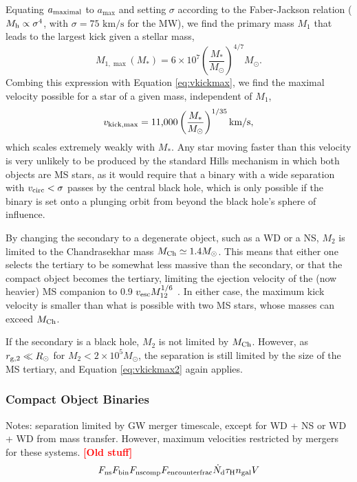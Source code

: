 \documentclass[a4paper,twocolumn]{emulateapj}
\newcommand{\colr}[1]{{\bf \textcolor{red}{[#1]}}}
\begin{document}
Equating $a_{\rm maximal}$ to $a_{\max}$ and setting $\sigma$ according to the Faber-Jackson relation ($M_{\rm h} \propto \sigma^{4}$, with $\sigma = \textrm{75 km/s}$ for the MW), we find the primary mass $M_{1}$ that leads to the largest kick given a stellar mass,
\begin{equation}
M_{1,\max} (M_{\ast}) = 6 \times 10^{7} \left(\frac{M_{\ast}}{M_{\odot}}\right)^{4/7} M_{\odot}.
\end{equation}
Combing this expression with Equation \ref{eq:vkickmax}, we find the maximal velocity possible for a star of a given mass, independent of $M_{1}$,
\begin{equation}
v_{\rm kick,\max} = \textrm{11,000} \left(\frac{M_{\ast}}{M_{\odot}}\right)^{1/35} \textrm{km/s}\label{eq:vkickmax2},
\end{equation}
which scales extremely weakly with $M_{\ast}$. Any star moving faster than this velocity is very unlikely to be produced by the standard Hills mechanism in which both objects are MS stars, as it would require that a binary with a wide separation with $v_{\rm circ} < \sigma$ passes by the central black hole, which is only possible if the binary is set onto a plunging orbit from beyond the black hole's sphere of influence.

By changing the secondary to a degenerate object, such as a WD or a NS, $M_{2}$ is limited to the Chandrasekhar mass $M_{\rm Ch} \simeq 1.4 M_{\odot}$. This means that either one selects the tertiary to be somewhat less massive than the secondary, or that the compact object becomes the tertiary, limiting the ejection velocity of the (now heavier) MS companion to 0.9 $v_{\rm esc} M_{12}^{1/6}$ \citep{Sari:2010a}. In either case, the maximum kick velocity is smaller than what is possible with two MS stars, whose masses can exceed $M_{\rm Ch}$.

If the secondary is a black hole, $M_{2}$ is not limited by $M_{\rm Ch}$. However, as $r_{\rm g,2} \ll R_{\odot}$ for $M_{2} < 2 \times 10^{5} M_{\odot}$, the separation is still limited by the size of the MS tertiary, and Equation \ref{eq:vkickmax2} again applies.

\subsubsection{Compact Object Binaries}
Notes: separation limited by GW merger timescale, except for WD + NS or WD + WD from mass transfer. However, maximum velocities restricted by mergers for these systems.
\colr{Old stuff}
\begin{equation}
F_{\rm ns} F_{\rm bin} F_{\rm ns comp} F_{\rm encounterfrac} \dot{N}_{\rm d} \tau_{\rm H} n_{\rm gal} V
\end{equation}
\end{document}
